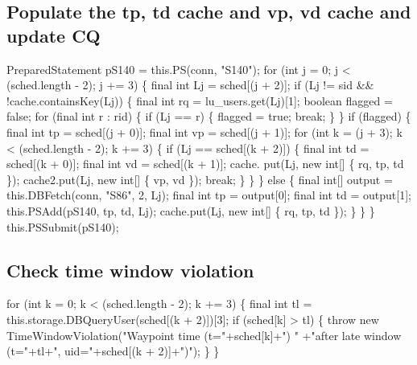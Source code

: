 \subsection{Populate the tp, td cache and vp, vd cache and update CQ}
\nwenddocs{}\endmoddef{}
PreparedStatement pS140 = this.PS(conn, "S140");
for (int j = 0; j < (sched.length - 2); j += 3) \{
  final int Lj = sched[(j + 2)];
  if (Lj != sid && !cache.containsKey(Lj)) \{
    final int rq = lu_users.get(Lj)[1];
    boolean flagged = false;
    for (final int r : rid) \{
      if (Lj == r) \{
        flagged = true;
        break;
      \}
    \}
    if (flagged) \{
      final int tp = sched[(j + 0)];
      final int vp = sched[(j + 1)];
      for (int k = (j + 3); k < (sched.length - 2); k += 3) \{
        if (Lj == sched[(k + 2)]) \{
          final int td = sched[(k + 0)];
          final int vd = sched[(k + 1)];
          cache. put(Lj, new int[] \{ rq, tp, td \});
          cache2.put(Lj, new int[] \{ vp, vd \});
          break;
        \}
      \}
    \} else \{
      final int[] output = this.DBFetch(conn, "S86", 2, Lj);
      final int tp = output[0];
      final int td = output[1];
      this.PSAdd(pS140, tp, td, Lj);
      cache.put(Lj, new int[] \{ rq, tp, td \});
    \}
  \}
\}
this.PSSubmit(pS140);
\nwendcode{}\nwdocspar

\subsection{Check time window violation}
\nwenddocs{}\endmoddef{}
for (int k = 0; k < (sched.length - 2); k += 3) \{
  final int tl = this.storage.DBQueryUser(sched[(k + 2)])[3];
  if (sched[k] > tl) \{
    throw new TimeWindowViolation("Waypoint time (t="+sched[k]+") "
        +"after late window (t="+tl+", uid="+sched[(k + 2)]+")");
  \}
\}
\nwendcode{}\nwdocspar

